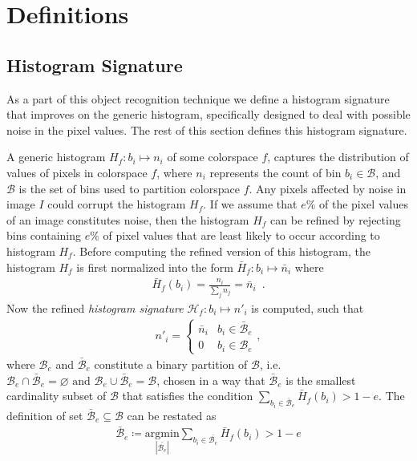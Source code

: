 \section{Definitions}

\subsection{Histogram Signature}
\label{sec:hist_signature}

As a part of this object recognition technique we define a histogram signature that improves on the generic histogram, specifically designed to deal with possible noise in the pixel values. The rest of this section defines this histogram signature.

A generic histogram $H_f:b_i\mapsto n_i$ of some colorspace $f$, captures the distribution of values of pixels in colorspace $f$, where $n_i$ represents the count of bin $b_i \in \mathcal{B}$, and $\mathcal{B}$ is the set of bins used to partition colorspace $f$. Any pixels affected by noise in image $I$ could corrupt the histogram $H_f$. If we assume that $e\%$ of the pixel values of an image constitutes noise, then the histogram $H_f$ can be refined by rejecting bins containing $e\%$ of pixel values that are least likely to occur according to histogram $H_f$. Before computing the refined version of this histogram, the histogram $H_f$ is first normalized into the form $\bar{H}_f:b_i\mapsto \bar{n}_i$ where
%
\begin{align}	\label{eqn:hist_norm}
 \bar{H}_f(b_i)=\frac{n_i}{\sum_{j}n_j}=\bar{n}_i \enspace.
\end{align}
Now the refined \emph{histogram signature} $\mathcal{H}_f:b_i\mapsto n'_i$ is computed, such that
\begin{align}
  n'_i = 
  \begin{cases}
     \bar{n}_i & b_i \in \bar{\mathcal{B}}_e\\
     0	&	b_i \in \mathcal{B}_e
  \end{cases},
\end{align}
%
where $\mathcal{B}_e$ and $\bar{\mathcal{B}}_e$ constitute a binary partition of $\mathcal{B}$, 
i.e. $\mathcal{B}_e \cap \bar{\mathcal{B}}_e = \varnothing \text{ and } 
\mathcal{B}_e \cup \bar{\mathcal{B}}_e = \mathcal{B}$,
chosen in a way that 
$\bar{\mathcal{B}}_e$ is the smallest cardinality subset of 
$\mathcal{B}$ that satisfies the condition $\sum_{b_i \in \bar{\mathcal{B}}_e} \bar{H}_f(b_i) > 1-e$. 
The definition of set $\bar{\mathcal{B}}_e\subseteq\mathcal{B}$ can be restated as
\begin{align}
 \bar{\mathcal{B}}_e \coloneqq \underset{|\bar{\mathcal{B}_e}|} {\mathrm{argmin}} \sum_{b_i \in \bar{\mathcal{B}_e}} \bar{H}_f(b_i) > 1-e
\end{align}

